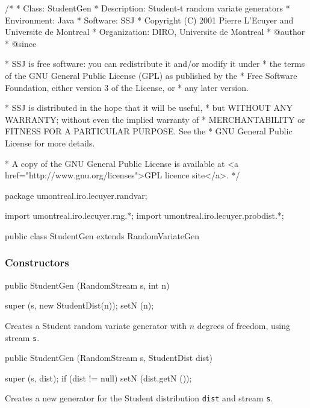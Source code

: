 \begin{code}
\begin{hide}
/*
 * Class:        StudentGen
 * Description:  Student-t random variate generators 
 * Environment:  Java
 * Software:     SSJ 
 * Copyright (C) 2001  Pierre L'Ecuyer and Universite de Montreal
 * Organization: DIRO, Universite de Montreal
 * @author       
 * @since

 * SSJ is free software: you can redistribute it and/or modify it under
 * the terms of the GNU General Public License (GPL) as published by the
 * Free Software Foundation, either version 3 of the License, or
 * any later version.

 * SSJ is distributed in the hope that it will be useful,
 * but WITHOUT ANY WARRANTY; without even the implied warranty of
 * MERCHANTABILITY or FITNESS FOR A PARTICULAR PURPOSE.  See the
 * GNU General Public License for more details.

 * A copy of the GNU General Public License is available at
   <a href="http://www.gnu.org/licenses">GPL licence site</a>.
 */
\end{hide}
package umontreal.iro.lecuyer.randvar;\begin{hide}
import umontreal.iro.lecuyer.rng.*;
import umontreal.iro.lecuyer.probdist.*;
\end{hide}

public class StudentGen extends RandomVariateGen \begin{hide} {
   protected int n = -1;
\end{hide}\end{code}

\subsubsection* {Constructors}
\begin{code}

   public StudentGen (RandomStream s, int n) \begin{hide} {
      super (s, new StudentDist(n));
      setN (n);
   }\end{hide}
\end{code}
\begin{tabb}  Creates a Student random variate generator with
 $n$ degrees of freedom, using stream \texttt{s}.
\end{tabb}
\begin{code}

   public StudentGen (RandomStream s, StudentDist dist) \begin{hide} {
      super (s, dist);
      if (dist != null)
         setN (dist.getN ());
   }\end{hide}
\end{code}
 \begin{tabb} Creates a new generator for the Student distribution \texttt{dist}
     and stream \texttt{s}.
 \end{tabb}

